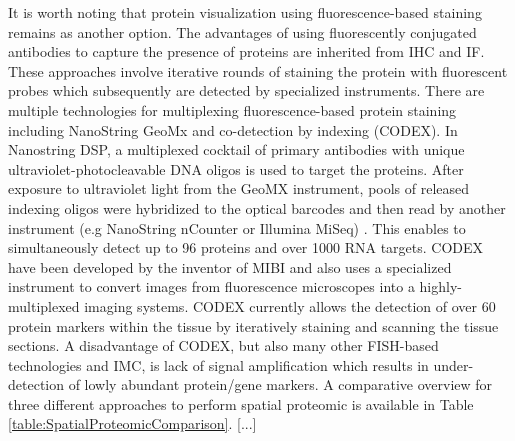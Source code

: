 It is worth noting that protein visualization using fluorescence-based staining remains as another option. The advantages of using fluorescently conjugated antibodies to capture the presence of proteins are inherited from IHC and IF. These approaches involve iterative rounds of staining the protein with fluorescent probes which subsequently are detected by specialized instruments. There are multiple technologies for multiplexing fluorescence-based protein staining including NanoString GeoMx and co-detection by indexing (CODEX). In Nanostring DSP, a multiplexed cocktail of primary antibodies with  unique ultraviolet-photocleavable DNA oligos is used to target the proteins. After exposure to ultraviolet light from the GeoMX instrument, pools of released indexing oligos were hybridized to the optical barcodes and then read by another instrument (e.g NanoString nCounter or Illumina MiSeq) \cite{de2020unraveling, helmink2020b}. This enables to simultaneously detect up to 96 proteins and over 1000 RNA targets. CODEX have been developed by the inventor of MIBI and also uses a specialized instrument to convert images from fluorescence microscopes into a highly-multiplexed imaging systems. CODEX currently allows the detection of over 60 protein markers within the tissue by iteratively staining and scanning the tissue sections\cite{goltsev2018deep}. A disadvantage of CODEX, but also many other FISH-based technologies and IMC, is lack of signal amplification which results in under-detection of lowly abundant protein/gene markers. A comparative overview for three different approaches to perform spatial proteomic is available in Table \ref{table:SpatialProteomicComparison}. [...]

\subsubsection{}
\subsubsection{}

